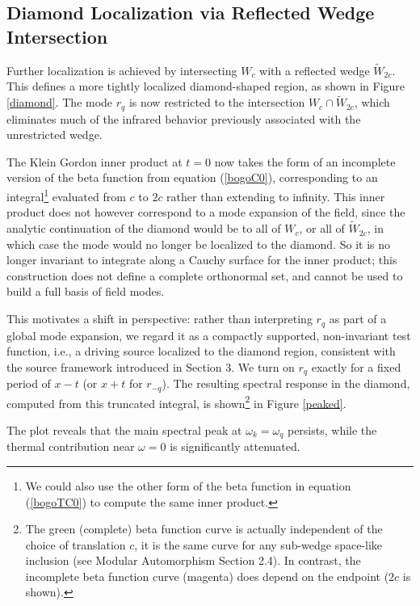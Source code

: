 \documentclass[12pt,a4paper]{article}
\begin{document}
\subsection{Diamond Localization via Reflected Wedge Intersection}

Further localization is achieved by intersecting $W_c$ with a reflected wedge $\widetilde{W}_{2c}$. This defines a more tightly localized diamond-shaped region, as shown in Figure \ref{diamond}. The mode $r_q$ is now restricted to the intersection $W_c \cap \widetilde{W}_{2c}$, which eliminates much of the infrared behavior previously associated with the unrestricted wedge.

The Klein Gordon inner product at $t=0$ now takes the form of an incomplete version of the beta function from equation (\ref{bogoC0}), corresponding to an integral\footnote{We could also use the other form of the beta function in equation (\ref{bogoTC0}) to compute the same inner product.} evaluated from $c$ to $2c$ rather than extending to infinity. This inner product does not however correspond to a mode expansion of the field, since the analytic continuation of the diamond would be to all of $W_c$, or all of $\widetilde{W}_{2c}$, in which case the mode would no longer be localized to the diamond.  So it is no longer invariant to integrate along a Cauchy surface for the inner product; this construction does not define a complete orthonormal set, and cannot be used to build a full basis of field modes.

This motivates a shift in perspective: rather than interpreting $r_q$ as part of a global mode expansion, we regard it as a compactly supported, non-invariant test function, i.e., a driving source localized to the diamond region, consistent with the source framework introduced in Section 3. We turn on $r_q$ exactly for a fixed period of $x-t$ (or $x+t$ for $r_{-q}$). The resulting spectral response in the diamond, computed from this truncated integral, is shown\footnote{The green (complete) beta function curve is actually independent of the choice of translation $c$, it is the same curve for any sub-wedge space-like inclusion (see Modular Automorphism Section 2.4). In contrast, the incomplete beta function curve (magenta) does depend on the endpoint ($2c$ is shown).} in Figure \ref{peaked}.


The plot reveals that the main spectral peak at $\omega_k = \omega_q$ persists, while the thermal contribution near $\omega = 0$ is significantly attenuated.
\end{document}
